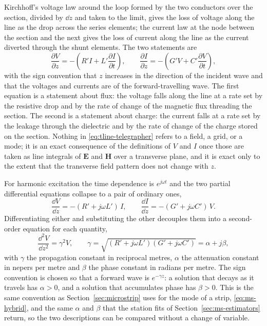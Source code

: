 Kirchhoff's voltage law around the loop formed by the two conductors over the section, divided by $\dd z$ and
taken to the limit, gives the loss of voltage along the line as the drop across the series elements; the
current law at the node between the section and the next gives the loss of current along the line as the
current diverted through the shunt elements. The two statements are
\begin{equation}
  \frac{\partial V}{\partial z} = -\left(R' I + L' \frac{\partial I}{\partial t}\right),
  \qquad
  \frac{\partial I}{\partial z} = -\left(G' V + C' \frac{\partial V}{\partial t}\right),
  \label{eq:tline-telegrapher}
\end{equation}
with the sign convention that $z$ increases in the direction of the incident wave and that the voltages and
currents are of the forward-travelling wave. The first equation is a statement about flux: the voltage falls
along the line at a rate set by the resistive drop and by the rate of change of the magnetic flux threading
the section. The second is a statement about charge: the current falls at a rate set by the leakage through
the dielectric and by the rate of change of the charge stored on the section. Nothing in
\eqref{eq:tline-telegrapher} refers to a field, a grid, or a mode; it is an exact consequence of the
definitions of $V$ and $I$ once those are taken as line integrals of $\mathbf{E}$ and $\mathbf{H}$ over a
transverse plane, and it is exact only to the extent that the transverse field pattern does not change with
$z$.

For harmonic excitation the time dependence is $e^{j\omega t}$ and the two partial differential equations
collapse to a pair of ordinary ones,
\begin{equation}
  \frac{\dd V}{\dd z} = -(R' + j\omega L')\,I, \qquad
  \frac{\dd I}{\dd z} = -(G' + j\omega C')\,V .
  \label{eq:tline-harmonic}
\end{equation}
Differentiating either and substituting the other decouples them into a second-order equation for each
quantity,
\begin{equation}
  \frac{\dd^2 V}{\dd z^2} = \gamma^2 V, \qquad
  \gamma = \sqrt{(R' + j\omega L')(G' + j\omega C')} = \alpha + j\beta,
  \label{eq:tline-propgamma}
\end{equation}
with $\gamma$ the propagation constant in reciprocal metres, $\alpha$ the attenuation constant in nepers per
metre and $\beta$ the phase constant in radians per metre. The sign convention is chosen so that a forward wave
is $e^{-\gamma z}$: a solution that decays as it travels has $\alpha > 0$, and a solution that accumulates phase
has $\beta > 0$. This is the same convention as Section~\ref{sec:microstrip} uses for the mode of a strip,
\eqref{eq:ms-hybrid}, and the same $\alpha$ and $\beta$ that the station fits of
Section~\ref{sec:ms-estimators} return, so the two descriptions can be compared without a change of variable.

